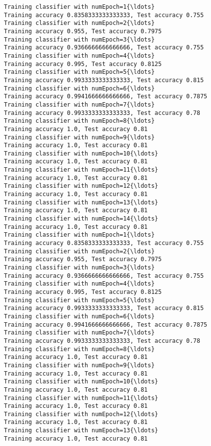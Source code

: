 \documentclass[11pt]{article}
\begin{document}
    \begin{Verbatim}[commandchars=\\\{\}]
Training classifier with numEpoch=1{\ldots}
Training accuracy 0.8358333333333333, Test accuracy 0.755
Training classifier with numEpoch=2{\ldots}
Training accuracy 0.955, Test accuracy 0.7975
Training classifier with numEpoch=3{\ldots}
Training accuracy 0.9366666666666666, Test accuracy 0.755
Training classifier with numEpoch=4{\ldots}
Training accuracy 0.995, Test accuracy 0.8125
Training classifier with numEpoch=5{\ldots}
Training accuracy 0.9933333333333333, Test accuracy 0.815
Training classifier with numEpoch=6{\ldots}
Training accuracy 0.9941666666666666, Test accuracy 0.7875
Training classifier with numEpoch=7{\ldots}
Training accuracy 0.9933333333333333, Test accuracy 0.78
Training classifier with numEpoch=8{\ldots}
Training accuracy 1.0, Test accuracy 0.81
Training classifier with numEpoch=9{\ldots}
Training accuracy 1.0, Test accuracy 0.81
Training classifier with numEpoch=10{\ldots}
Training accuracy 1.0, Test accuracy 0.81
Training classifier with numEpoch=11{\ldots}
Training accuracy 1.0, Test accuracy 0.81
Training classifier with numEpoch=12{\ldots}
Training accuracy 1.0, Test accuracy 0.81
Training classifier with numEpoch=13{\ldots}
Training accuracy 1.0, Test accuracy 0.81
Training classifier with numEpoch=14{\ldots}
Training accuracy 1.0, Test accuracy 0.81
Training classifier with numEpoch=1{\ldots}
Training accuracy 0.8358333333333333, Test accuracy 0.755
Training classifier with numEpoch=2{\ldots}
Training accuracy 0.955, Test accuracy 0.7975
Training classifier with numEpoch=3{\ldots}
Training accuracy 0.9366666666666666, Test accuracy 0.755
Training classifier with numEpoch=4{\ldots}
Training accuracy 0.995, Test accuracy 0.8125
Training classifier with numEpoch=5{\ldots}
Training accuracy 0.9933333333333333, Test accuracy 0.815
Training classifier with numEpoch=6{\ldots}
Training accuracy 0.9941666666666666, Test accuracy 0.7875
Training classifier with numEpoch=7{\ldots}
Training accuracy 0.9933333333333333, Test accuracy 0.78
Training classifier with numEpoch=8{\ldots}
Training accuracy 1.0, Test accuracy 0.81
Training classifier with numEpoch=9{\ldots}
Training accuracy 1.0, Test accuracy 0.81
Training classifier with numEpoch=10{\ldots}
Training accuracy 1.0, Test accuracy 0.81
Training classifier with numEpoch=11{\ldots}
Training accuracy 1.0, Test accuracy 0.81
Training classifier with numEpoch=12{\ldots}
Training accuracy 1.0, Test accuracy 0.81
Training classifier with numEpoch=13{\ldots}
Training accuracy 1.0, Test accuracy 0.81

\end{Verbatim}
\end{document}
